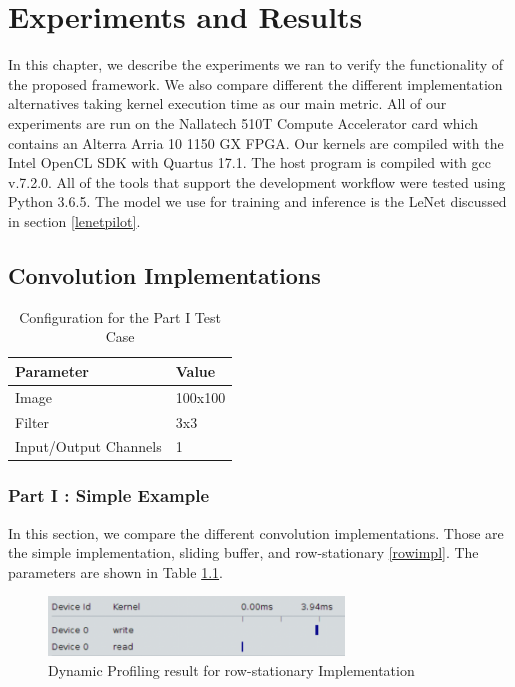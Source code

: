 
\chapter{Experiments and Results} %

\label{Chapter4} %

In this chapter, we describe the experiments we ran to verify the functionality of the proposed framework. We also compare different the different implementation alternatives taking kernel execution time as our main metric. All of our experiments are run on the Nallatech 510T Compute Accelerator card which contains an Alterra Arria 10 1150 GX FPGA. Our kernels are compiled with the Intel OpenCL SDK with Quartus 17.1. The host program is compiled with gcc v.7.2.0. All of the tools that support the development workflow were tested using Python 3.6.5. 
The model we use for training and inference is the LeNet discussed in section \ref{lenetpilot}.


\section{Convolution Implementations}

\begin{table}[]
\centering
\begin{tabular}{|l|l|}
\hline
\textbf{Parameter}    & \textbf{Value} \\ \hline
Image                 & 100x100        \\ \hline
Filter                & 3x3            \\ \hline
Input/Output Channels & 1              \\ \hline
\end{tabular}
\caption{Configuration for the Part I Test Case}
\label{tab:partoneconfig}
\end{table}

\subsection{Part I : Simple Example} \label{testone}
In this section, we compare the different convolution implementations. Those are the simple implementation, sliding buffer, and row-stationary \ref{rowimpl}. The parameters are shown in Table \ref{tab:partoneconfig}. 

\begin{figure}[h]
\centering
\includegraphics[width=0.7\textwidth]{Figures/profilerow}
\decoRule
\caption[profilerow]{ Dynamic Profiling result for row-stationary Implementation}
\label{fig:rowstatp}
\end{figure}

